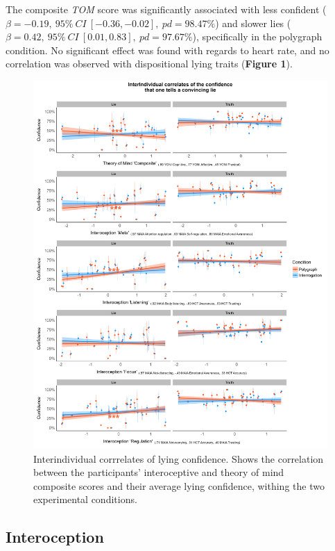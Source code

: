 \documentclass[
  man,floatsintext]{apa6}
\begin{document}
The composite \emph{TOM} score was significantly associated with less confident (\(\beta=-0.19,~95\%~CI~[-0.36, -0.02],~pd = 98.47\%\)) and slower lies (\(\beta=0.42,~95\%~CI~[0.01, 0.83],~pd = 97.67\%\)), specifically in the polygraph condition. No significant effect was found with regards to heart rate, and no correlation was observed with dispositional lying traits (\textbf{Figure 1}).

\begin{figure}
\includegraphics[width=1\linewidth]{../figures/figure1} \caption{Interindividual corrrelates of lying confidence. Shows the correlation between the participants' interoceptive and theory of mind composite scores and their average lying confidence, withing the two experimental conditions.}\label{fig:unnamed-chunk-1}
\end{figure}

\hypertarget{interoception-1}{%
\subsection{Interoception}\label{interoception-1}}
\end{document}
